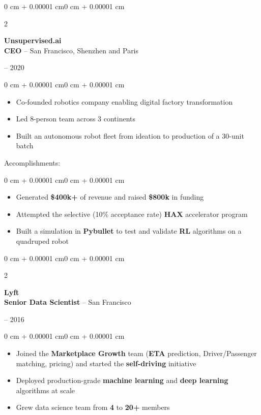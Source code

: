 \documentclass[10pt, letterpaper]{article}
\newenvironment{highlights}{
    \begin{itemize}[
        topsep=0.10 cm,
        parsep=0.10 cm,
        partopsep=0pt,
        itemsep=0pt,
        leftmargin=1.5 cm
    ]
}{
    \end{itemize}
}
\newenvironment{highlightsforbulletentries}{
    \begin{itemize}[
        topsep=0.10 cm,
        parsep=0.10 cm,
        partopsep=0pt,
        itemsep=0pt,
        leftmargin=1.5 cm
    ]
}{
    \end{itemize}
}
\newenvironment{onecolentry}{
    \begin{adjustwidth}{0 cm + 0.00001 cm}{0 cm + 0.00001 cm}
}{
    \end{adjustwidth}
}
\newenvironment{twocolentry}[2][]{
    \onecolentry
    \def\secondColumn{#2}
    \setcolumnwidth{\fill, 4.5 cm}
    \begin{paracol}{2}
}{
    \switchcolumn \raggedleft \secondColumn
    \end{paracol}
    \endonecolentry
}
\begin{document}
    \begin{twocolentry}{2016 -- 2020}
        \textbf{Unsupervised.ai} \\
        \textbf{CEO} -- San Francisco, Shenzhen and Paris
    \end{twocolentry}
    \begin{onecolentry}
        \begin{highlights}
            \item Co-founded robotics company enabling digital factory transformation
            \item Led 8-person team across 3 continents
            \item Built an autonomous robot fleet from ideation to production of a 30-unit batch
        \end{highlights}
    \end{onecolentry}

    Accomplishments:
    \begin{onecolentry}
        \begin{highlightsforbulletentries}
            \item Generated \textbf{\$400k+} of revenue and raised \textbf{\$800k} in funding
            \item Attempted the selective (10\% acceptance rate) \textbf{HAX} accelerator program
            \item Built a simulation in \textbf{Pybullet} to test and validate \textbf{RL} algorithms on a quadruped robot
        \end{highlightsforbulletentries}
    \end{onecolentry}

    \vspace{0.5cm}

    \begin{twocolentry}{2014 -- 2016}
        \textbf{Lyft} \\
        \textbf{Senior Data Scientist} -- San Francisco
    \end{twocolentry}
    \begin{onecolentry}
        \begin{highlights}
            \item Joined the \textbf{Marketplace Growth} team (\textbf{ETA} prediction, Driver/Passenger matching, pricing) and started the \textbf{self-driving} initiative
            \item Deployed production-grade \textbf{machine learning} and \textbf{deep learning} algorithms at scale
            \item Grew data science team from \textbf{4} to \textbf{20+} members
        \end{highlights}
    \end{onecolentry}
\end{document}
